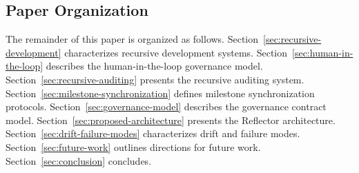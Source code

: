 \subsection{Paper Organization}

The remainder of this paper is organized as follows.
Section~\ref{sec:recursive-development} characterizes recursive development systems.
Section~\ref{sec:human-in-the-loop} describes the human-in-the-loop governance model.
Section~\ref{sec:recursive-auditing} presents the recursive auditing system.
Section~\ref{sec:milestone-synchronization} defines milestone synchronization protocols.
Section~\ref{sec:governance-model} describes the governance contract model.
Section~\ref{sec:proposed-architecture} presents the Reflector architecture.
Section~\ref{sec:drift-failure-modes} characterizes drift and failure modes.
Section~\ref{sec:future-work} outlines directions for future work.
Section~\ref{sec:conclusion} concludes.
